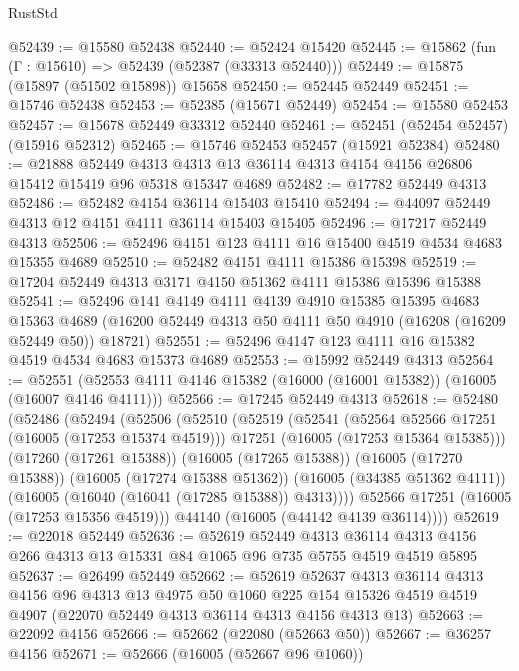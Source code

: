 \begin{lexlean}{RustStd}
\begin{coremodule}
@52439 := @15580 @52438
@52440 := @52424 @15420
@52445 := @15862 (fun (Γ : @15610) => @52439 (@52387 (@33313 @52440)))
@52449 := @15875 (@15897 (@51502 @15898)) @15658
@52450 := @52445 @52449
@52451 := @15746 @52438
@52453 := @52385 (@15671 @52449)
@52454 := @15580 @52453
@52457 := @15678 @52449 @33312 @52440
@52461 := @52451 (@52454 @52457) (@15916 @52312)
@52465 := @15746 @52453 @52457 (@15921 @52384)
@52480 := @21888
    @52449
    @4313
    @4313
    @13
    @36114
    @4313
    @4154
    @4156
    @26806
    @15412
    @15419
    @96
    @5318
    @15347
    @4689
@52482 := @17782 @52449 @4313
@52486 := @52482 @4154 @36114 @15403 @15410
@52494 := @44097 @52449 @4313 @12 @4151 @4111 @36114 @15403 @15405
@52496 := @17217 @52449 @4313
@52506 := @52496 @4151 @123 @4111 @16 @15400 @4519 @4534 @4683 @15355 @4689
@52510 := @52482 @4151 @4111 @15386 @15398
@52519 := @17204 @52449 @4313 @3171 @4150 @51362 @4111 @15386 @15396 @15388
@52541 := @52496
    @141
    @4149
    @4111
    @4139
    @4910
    @15385
    @15395
    @4683
    @15363
    @4689
    (@16200 @52449 @4313 @50 @4111 @50 @4910 (@16208 (@16209 @52449 @50)) @18721)
@52551 := @52496 @4147 @123 @4111 @16 @15382 @4519 @4534 @4683 @15373 @4689
@52553 := @15992 @52449 @4313
@52564 := @52551 (@52553 @4111 @4146 @15382 (@16000 (@16001 @15382)) (@16005 (@16007 @4146 @4111)))
@52566 := @17245 @52449 @4313
@52618 := @52480
    (@52486
      (@52494
        (@52506
          (@52510
            (@52519
              (@52541
                (@52564 @52566 @17251 (@16005 (@17253 @15374 @4519)))
                @17251
                (@16005 (@17253 @15364 @15385)))
              (@17260 (@17261 @15388))
              (@16005 (@17265 @15388))
              (@16005 (@17270 @15388))
              (@16005 (@17274 @15388 @51362))
              (@16005 (@34385 @51362 @4111))
              (@16005 (@16040 (@16041 (@17285 @15388)) @4313))))
          @52566
          @17251
          (@16005 (@17253 @15356 @4519)))
        @44140
        (@16005 (@44142 @4139 @36114))))
@52619 := @22018 @52449
@52636 := @52619
    @52449
    @4313
    @36114
    @4313
    @4156
    @266
    @4313
    @13
    @15331
    @84
    @1065
    @96
    @735
    @5755
    @4519
    @4519
    @5895
@52637 := @26499 @52449
@52662 := @52619
    @52637
    @4313
    @36114
    @4313
    @4156
    @96
    @4313
    @13
    @4975
    @50
    @1060
    @225
    @154
    @15326
    @4519
    @4519
    @4907
    (@22070 @52449 @4313 @36114 @4313 @4156 @4313 @13)
@52663 := @22092 @4156
@52666 := @52662 (@22080 (@52663 @50))
@52667 := @36257 @4156
@52671 := @52666 (@16005 (@52667 @96 @1060))

\end{coremodule}
\end{lexlean}
